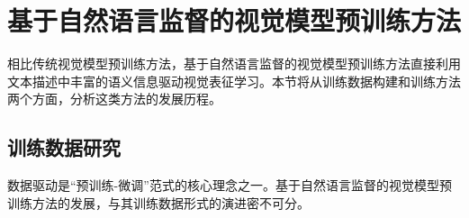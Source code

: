 
\section{基于自然语言监督的视觉模型预训练方法}
相比传统视觉模型预训练方法，基于自然语言监督的视觉模型预训练方法直接利用文本描述中丰富的语义信息驱动视觉表征学习。本节将从训练数据构建和训练方法两个方面，分析这类方法的发展历程。%

\subsection{训练数据研究}
数据驱动是“预训练-微调”范式的核心理念之一。基于自然语言监督的视觉模型预训练方法的发展，与其训练数据形式的演进密不可分。

